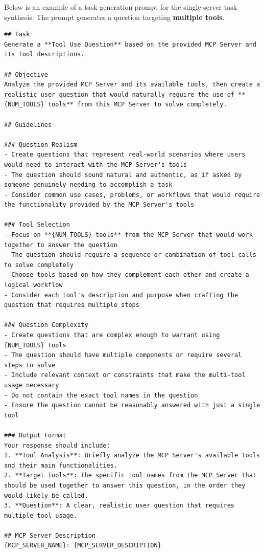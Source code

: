 Below is an example of a task generation prompt for the single-server task synthesis. The prompt generates a question targeting \textbf{multiple tools}.

\begin{verbatim}
## Task
Generate a **Tool Use Question** based on the provided MCP Server and its tool descriptions.

## Objective
Analyze the provided MCP Server and its available tools, then create a realistic user question that would naturally require the use of **{NUM_TOOLS} tools** from this MCP Server to solve completely.

## Guidelines

### Question Realism
- Create questions that represent real-world scenarios where users would need to interact with the MCP Server's tools
- The question should sound natural and authentic, as if asked by someone genuinely needing to accomplish a task
- Consider common use cases, problems, or workflows that would require the functionality provided by the MCP Server's tools

### Tool Selection
- Focus on **{NUM_TOOLS} tools** from the MCP Server that would work together to answer the question
- The question should require a sequence or combination of tool calls to solve completely
- Choose tools based on how they complement each other and create a logical workflow
- Consider each tool's description and purpose when crafting the question that requires multiple steps

### Question Complexity
- Create questions that are complex enough to warrant using {NUM_TOOLS} tools
- The question should have multiple components or require several steps to solve
- Include relevant context or constraints that make the multi-tool usage necessary
- Do not contain the exact tool names in the question
- Ensure the question cannot be reasonably answered with just a single tool

### Output Format
Your response should include:
1. **Tool Analysis**: Briefly analyze the MCP Server's available tools and their main functionalities.
2. **Target Tools**: The specific tool names from the MCP Server that should be used together to answer this question, in the order they would likely be called.
3. **Question**: A clear, realistic user question that requires multiple tool usage.

## MCP Server Description
{MCP_SERVER_NAME}: {MCP_SERVER_DESCRIPTION}


\end{verbatim}
